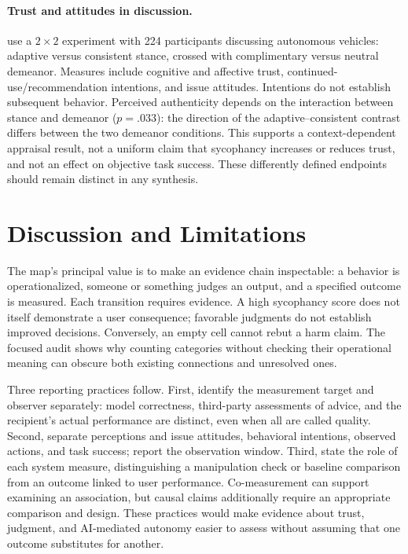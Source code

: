 \documentclass[letterpaper]{article}
\begin{document}
\paragraph{Trust and attitudes in discussion.}
\citet{10.1145/3772318.3791079} use a $2\times2$ experiment with 224 participants discussing autonomous vehicles: adaptive versus consistent stance, crossed with complimentary versus neutral demeanor. Measures include cognitive and affective trust, continued-use/recommendation intentions, and issue attitudes. Intentions do not establish subsequent behavior. Perceived authenticity depends on the interaction between stance and demeanor ($p=.033$): the direction of the adaptive--consistent contrast differs between the two demeanor conditions. This supports a context-dependent appraisal result, not a uniform claim that sycophancy increases or reduces trust, and not an effect on objective task success. These differently defined endpoints should remain distinct in any synthesis.

\section{Discussion and Limitations}
The map's principal value is to make an evidence chain inspectable: a behavior is operationalized, someone or something judges an output, and a specified outcome is measured. Each transition requires evidence. A high sycophancy score does not itself demonstrate a user consequence; favorable judgments do not establish improved decisions. Conversely, an empty cell cannot rebut a harm claim. The focused audit shows why counting categories without checking their operational meaning can obscure both existing connections and unresolved ones.

Three reporting practices follow. First, identify the measurement target and observer separately: model correctness, third-party assessments of advice, and the recipient's actual performance are distinct, even when all are called quality. Second, separate perceptions and issue attitudes, behavioral intentions, observed actions, and task success; report the observation window. Third, state the role of each system measure, distinguishing a manipulation check or baseline comparison from an outcome linked to user performance. Co-measurement can support examining an association, but causal claims additionally require an appropriate comparison and design. These practices would make evidence about trust, judgment, and AI-mediated autonomy easier to assess without assuming that one outcome substitutes for another.
\end{document}
